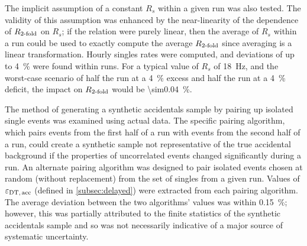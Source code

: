 The implicit assumption of a constant $R_s$ within a given run was also tested.
The validity of this assumption was enhanced by the near-linearity of
the dependence of $R_{\text{\ensuremath{2}-fold}}$ on $R_s$;
if the relation were purely linear,
then the average of $R_s$ within a run could be used to exactly compute
the average $R_{\text{\ensuremath{2}-fold}}$ since averaging is a linear transformation.
Hourly singles rates were computed, and deviations of up to \SI{4}{\percent}
were found within runs.
For a typical value of $R_s$ of \SI{18}{\Hz},
and the worst-case scenario of half the run at a \SI{4}{\percent} excess
and half the run at a \SI{4}{\percent} deficit,
the impact on $R_{\text{\ensuremath{2}-fold}}$ would be \SI{\sim0.04}{\percent}.

The method of generating a synthetic accidentals sample
by pairing up isolated single events was examined using actual data.
The specific pairing algorithm, which pairs events from the first half of a run
with events from the second half of a run,
could create a synthetic sample not representative of the true accidental background
if the properties of uncorrelated events changed significantly during a run.
An alternate pairing algorithm was designed to pair isolated events
chosen at random (without replacement) from the set of singles from a given run.
Values of $\varepsilon_{\text{DT,\,acc}}$ (defined in \cref{subsec:delayed}) were extracted from each pairing algorithm.
The average deviation between the two algorithms' values was within \SI{0.15}{\percent};
however, this was partially attributed to the finite statistics
of the synthetic accidentals sample
and so was not necessarily indicative of a major source of systematic uncertainty.

